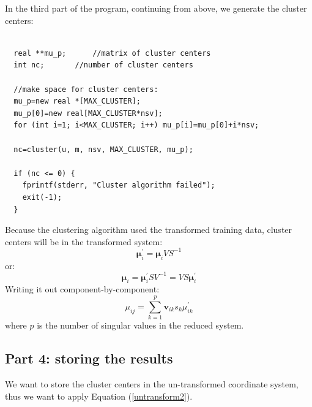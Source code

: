 \documentclass{article}
\renewcommand{\vec}[1]{\boldsymbol{#1}}
\begin{document}
In the third part of the program, continuing from above, we generate the
cluster centers:

\begin{verbatim}

  real **mu_p;		//matrix of cluster centers
  int nc;		//number of cluster centers

  //make space for cluster centers:
  mu_p=new real *[MAX_CLUSTER];
  mu_p[0]=new real[MAX_CLUSTER*nsv];
  for (int i=1; i<MAX_CLUSTER; i++) mu_p[i]=mu_p[0]+i*nsv;

  nc=cluster(u, m, nsv, MAX_CLUSTER, mu_p);

  if (nc <= 0) {
    fprintf(stderr, "Cluster algorithm failed");
    exit(-1);
  }

\end{verbatim}

Because the clustering algorithm used the transformed training data, 
cluster centers will be in the transformed system:
\begin{equation}
	\vec \mu^\prime_i = \vec \mu_i V S^{-1}
\end{equation}
or:
\begin{equation}
	\vec \mu_i = \vec \mu^\prime_i S V^{-1} = V S \vec \mu^\prime_i
	\label{untransform}
\end{equation}
Writing it out component-by-component:
\begin{equation}
	\mu_{ij} = \sum_{k=1}^p \vec v_{ik} s_k \mu_{ik}^\prime
	\label{untransform2}
\end{equation}
where $p$ is the number of singular values in the reduced system.

\subsection{Part 4: storing the results}

We want to store the cluster centers in the un-transformed coordinate system,
thus we want to apply Equation (\ref{untransform2}).
\end{document}
